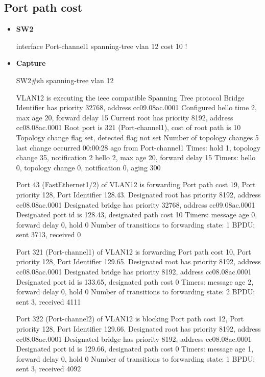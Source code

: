 \documentclass[10pt]{article}
\begin{document}
\subsection{Port path cost}
\begin{itemize}
\item {\bf SW2}
\begin{verbatim*}
interface Port-channel1
 spanning-tree vlan 12 cost 10
!
\end{verbatim*}
\item {\bf Capture}
\begin{verbatim*}
SW2#sh spanning-tree vlan 12

VLAN12 is executing the ieee compatible Spanning Tree protocol
Bridge Identifier has priority 32768, address cc09.08ac.0001
Configured hello time 2, max age 20, forward delay 15
Current root has priority 8192, address cc08.08ac.0001
Root port is 321 (Port-channel1), cost of root path is 10
Topology change flag set, detected flag not set
Number of topology changes 5 last change occurred 00:00:28 ago
from Port-channel1
Times:  hold 1, topology change 35, notification 2
hello 2, max age 20, forward delay 15
Timers: hello 0, topology change 0, notification 0, aging 300

Port 43 (FastEthernet1/2) of VLAN12 is forwarding
Port path cost 19, Port priority 128, Port Identifier 128.43.
Designated root has priority 8192, address cc08.08ac.0001
Designated bridge has priority 32768, address cc09.08ac.0001
Designated port id is 128.43, designated path cost 10
Timers: message age 0, forward delay 0, hold 0
Number of transitions to forwarding state: 1
BPDU: sent 3713, received 0

Port 321 (Port-channel1) of VLAN12 is forwarding
Port path cost 10, Port priority 128, Port Identifier 129.65.
Designated root has priority 8192, address cc08.08ac.0001
Designated bridge has priority 8192, address cc08.08ac.0001
Designated port id is 133.65, designated path cost 0
Timers: message age 2, forward delay 0, hold 0
Number of transitions to forwarding state: 2
BPDU: sent 3, received 4111

Port 322 (Port-channel2) of VLAN12 is blocking
Port path cost 12, Port priority 128, Port Identifier 129.66.
Designated root has priority 8192, address cc08.08ac.0001
Designated bridge has priority 8192, address cc08.08ac.0001
Designated port id is 129.66, designated path cost 0
Timers: message age 1, forward delay 0, hold 0
Number of transitions to forwarding state: 1
BPDU: sent 3, received 4092
\end{verbatim*}
\end{itemize}
\end{document}
